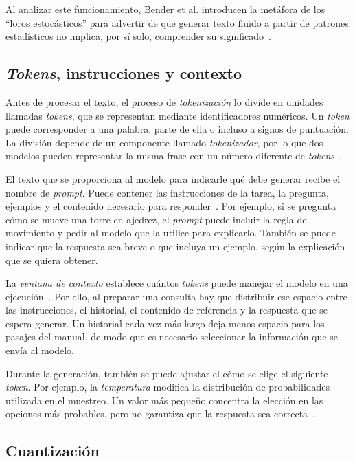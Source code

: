 Al analizar este funcionamiento, Bender et al. introducen la metáfora de los
\enquote{loros estocásticos} para advertir de que generar texto fluido a partir
de patrones estadísticos no implica, por sí solo, comprender su
significado~\cite{bender2021stochastic}.

\subsection{\textit{Tokens}, instrucciones y contexto}

Antes de procesar el texto, el proceso de \textit{tokenización} lo divide en
unidades llamadas \textit{tokens}, que se representan mediante
identificadores numéricos. Un \textit{token} puede corresponder a una
palabra, parte de ella o incluso a signos de puntuación. La división depende
de un componente llamado \textit{tokenizador}, por lo que dos modelos pueden
representar la misma frase con un número diferente de
\textit{tokens}~\cite{hf_tokenizacion}.

El texto que se proporciona al modelo para indicarle qué debe generar recibe
el nombre de \textit{prompt}. Puede contener las instrucciones de la tarea, la
pregunta, ejemplos y el contenido necesario para responder~\cite{brown2020language}.
Por ejemplo, si se pregunta cómo se mueve una torre en ajedrez, el
\textit{prompt} puede incluir la regla de movimiento y pedir al modelo que la
utilice para explicarlo. También se puede indicar que la respuesta sea
breve o que incluya un ejemplo, según la explicación que se quiera obtener.

La \textit{ventana de contexto} establece cuántos \textit{tokens} puede manejar el
modelo en una ejecución~\cite{ollama_contexto}. Por ello, al preparar una
consulta hay que distribuir ese espacio entre las instrucciones, el historial,
el contenido de referencia y la respuesta que se espera generar. Un historial
cada vez más largo deja menos espacio para los pasajes del manual, de modo que
es necesario seleccionar la información que se envía al modelo.

Durante la generación, también se puede ajustar el cómo se elige el siguiente
\textit{token}. Por ejemplo, la \textit{temperatura} modifica la distribución de
probabilidades utilizada en el muestreo. Un valor más pequeño concentra la
elección en las opciones más probables, pero no garantiza que la respuesta sea correcta~\cite{hf_generacion}.

\subsection{Cuantización}

